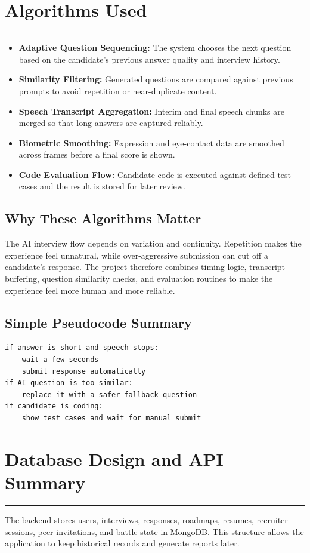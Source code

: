 ﻿\documentclass[12pt,a4paper]{article}
\newcommand{\sectionline}{\vspace{0.4em}\hrule\vspace{0.8em}}
\begin{document}
\section{Algorithms Used}
\sectionline
\begin{itemize}
  \item \textbf{Adaptive Question Sequencing:} The system chooses the next question based on the candidate's previous answer quality and interview history.
  \item \textbf{Similarity Filtering:} Generated questions are compared against previous prompts to avoid repetition or near-duplicate content.
  \item \textbf{Speech Transcript Aggregation:} Interim and final speech chunks are merged so that long answers are captured reliably.
  \item \textbf{Biometric Smoothing:} Expression and eye-contact data are smoothed across frames before a final score is shown.
  \item \textbf{Code Evaluation Flow:} Candidate code is executed against defined test cases and the result is stored for later review.
\end{itemize}

\subsection{Why These Algorithms Matter}
The AI interview flow depends on variation and continuity. Repetition makes the experience feel unnatural, while over-aggressive submission can cut off a candidate's response. The project therefore combines timing logic, transcript buffering, question similarity checks, and evaluation routines to make the experience feel more human and more reliable.

\subsection{Simple Pseudocode Summary}
\begin{verbatim}
if answer is short and speech stops:
    wait a few seconds
    submit response automatically
if AI question is too similar:
    replace it with a safer fallback question
if candidate is coding:
    show test cases and wait for manual submit
\end{verbatim}

\clearpage

\section{Database Design and API Summary}
\sectionline
The backend stores users, interviews, responses, roadmaps, resumes, recruiter sessions, peer invitations, and battle state in MongoDB. This structure allows the application to keep historical records and generate reports later.
\end{document}
